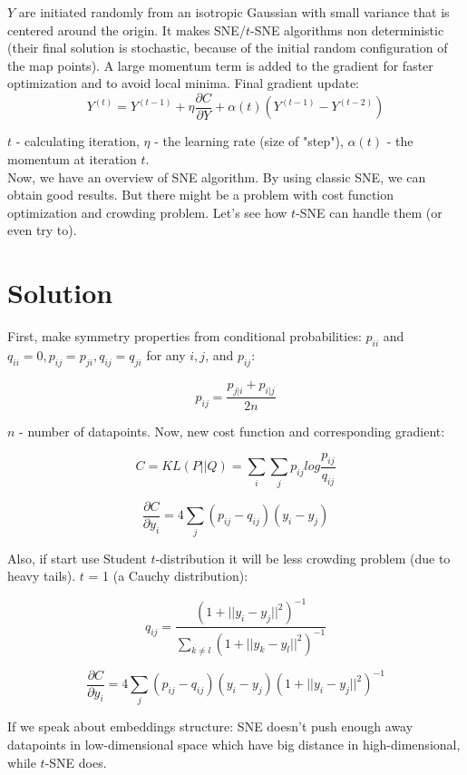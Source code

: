 $Y$ are initiated randomly from an isotropic Gaussian with small variance that is centered around the origin. It makes SNE/$t$-SNE algorithms non deterministic (their final solution is stochastic, because of the initial random configuration of the map points). A large momentum term is added to the gradient for faster optimization and to avoid local minima. Final gradient update:\\

$$ Y^{(t)} = Y^{(t-1)} + \eta \frac{\partial C}{\partial Y} + \alpha(t)(Y^{(t-1)} - Y^{(t-2)})$$

$t$ - calculating iteration, $\eta$ - the learning rate (size of "step"), $\alpha(t)$ - the momentum at iteration $t$.\\

Now, we have an overview of SNE algorithm. By using classic SNE, we can obtain good results. But there might be a problem with cost function optimization and crowding problem. Let's see how $t$-SNE can handle them (or even try to).

\section{Solution}
First, make symmetry properties from conditional probabilities: $p_{ii}$ and $q_{ii} = 0, p_{ij} = p_{ji}, q_{ij} = q_{ji}$ for any $i, j$, and $p_{ij}$:

$$ p_{ij} = \frac{p_{j|i} + p_{i|j}}{2n} $$

$n$ - number of datapoints. Now, new cost function and corresponding gradient:

$$ C = KL(P||Q) = \sum_i{\sum_j{p_{ij}log{\frac{p_{ij}}{q_{ij}}}}} $$

$$ \frac{\partial C}{\partial y_i} = 4 \sum_j{(p_{ij} - q_{ij})(y_i - y_j)} $$

Also, if start use Student $t$-distribution it will be less crowding problem (due to heavy tails). $t$ = 1 (a Cauchy distribution):

\begin{equation}
    q_{ij} = \frac{(1 + ||y_i - y_j||^2)^{-1}}{\sum_{k \ne l}{(1 + ||y_k - y_l||^2)^{-1}}}
\end{equation}

\begin{equation}
    \frac{\partial C}{\partial y_i} = 4 \sum_j{(p_{ij} - q_{ij})(y_i - y_j)(1 + ||y_i - y_j||^2)^{-1}}
\end{equation}

If we speak about embeddings structure: SNE doesn't push enough away datapoints in low-dimensional space which have big distance in high-dimensional, while $t$-SNE does.\\

